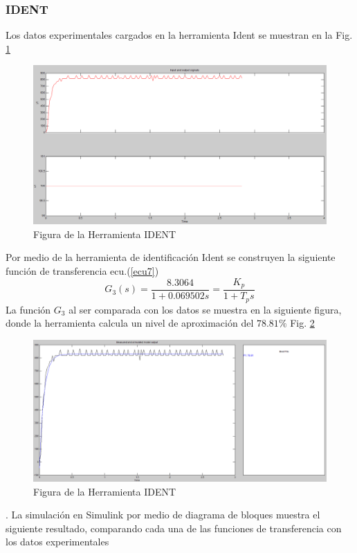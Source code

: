 \documentclass[twocolumn]{IEEEtran}
\begin{document}
\subsubsection{IDENT}
\noindent
Los datos experimentales cargados en la herramienta Ident se muestran en la Fig. \ref{fig5}
\begin{figure}[H]
	\centering
		\includegraphics[scale=0.17]{figure5.png}
	\caption{Figura de la Herramienta IDENT}
	\label{fig5}
\end{figure}
\noindent
Por medio de la herramienta de identificación Ident se construyen la siguiente función de transferencia ecu.(\ref{ecu7})
\begin{equation}
 G_3(s)=\frac{8.3064}{1+0.069502s}=\frac{K_p}{1+T_p s}
\label{ecu7}
\end{equation}
\noindent
La función $G_3$ al ser comparada con los datos se muestra en la siguiente figura, donde la herramienta calcula un nivel de aproximación del $78.81\%$ Fig. \ref{fig6}
\begin{figure}[H]
	\centering
		\includegraphics[scale=0.17]{figure6.png}
	\caption{Figura de la Herramienta IDENT}
	\label{fig6}
\end{figure}
. La simulación en Simulink por medio de diagrama de bloques muestra el siguiente resultado, comparando cada una de las funciones de transferencia con los datos experimentales
\end{document}
